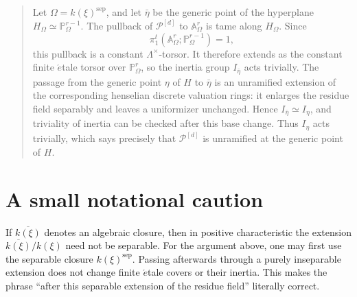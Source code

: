 \documentclass[11pt]{article}
\newcommand{\cP}{\mathcal P}
\begin{document}
\begin{quote}
Let $\Omega=k(\xi)^{\mathrm{sep}}$, and let $\bar\eta$ be the generic point
of the hyperplane
$H_\Omega\simeq\mathbb P^{r-1}_\Omega$.  The pullback of $\cP^{[d]}$ to
$\mathbb A^r_\Omega$ is tame along $H_\Omega$.  Since
\[
  \pi_1^t(\mathbb A^r_\Omega;\mathbb P^{r-1}_\Omega)=1,
\]
this pullback is a constant $\Lambda^\times$-torsor.  It therefore extends
as the constant finite \(\acute{e}\)tale torsor over $\mathbb P^r_\Omega$,
so the inertia group $I_{\bar\eta}$ acts trivially.  The passage from the
generic point $\eta$ of $H$ to $\bar\eta$ is an unramified extension of the
corresponding henselian discrete valuation rings: it enlarges the residue
field separably and leaves a uniformizer unchanged.  Hence
$I_{\bar\eta}\simeq I_\eta$, and triviality of inertia can be checked after
this base change.  Thus $I_\eta$ acts trivially, which says precisely that
$\cP^{[d]}$ is unramified at the generic point of $H$.
\end{quote}

\section*{A small notational caution}

If $\overline{k(\xi)}$ denotes an algebraic closure, then in positive
characteristic the extension
$\overline{k(\xi)}/k(\xi)$ need not be separable.  For the argument above,
one may first use the separable closure $k(\xi)^{\mathrm{sep}}$.  Passing
afterwards through a purely inseparable extension does not change finite
\(\acute{e}\)tale covers or their inertia.  This makes the phrase
``after this separable extension of the residue field'' literally correct.
\end{document}
